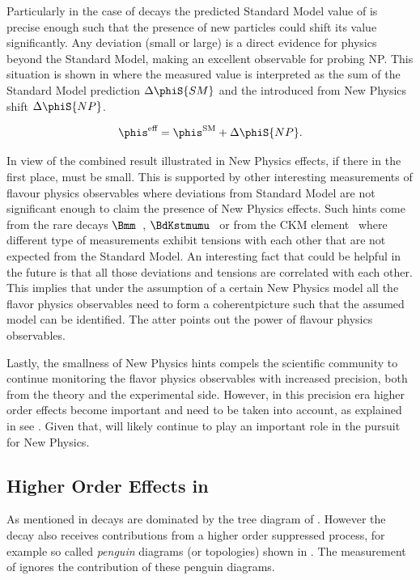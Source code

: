 Particularly in the case of \BsJpsiPhi decays the predicted Standard Model value of  is precise enough
such that the presence of new particles could shift its value ~\cite{Buras:2009if,Chiang:2009ev,Datta:2009fk} significantly.
Any deviation (small or large) is a direct evidence for physics beyond the Standard Model, making \phis an excellent observable for probing NP.
This situation is shown in  where the measured value  is interpreted
as the sum of the Standard Model prediction $\Delta\phiS{SM}$ and the introduced from New Physics shift $\Delta\phiS{NP}$.

\begin{equation}
  \centering
 \phis^{\text {eff}} = \phis^{\tiny \text{SM}} + \Delta\phiS{NP}.
 \label{phis_meas}
\end{equation}

In view of the combined \phis result illustrated in  New Physics effects, if there in the first place, must be small.
This is supported by other interesting measurements of flavour physics observables where deviations from Standard Model are not significant enough
to claim the presence of New Physics effects. Such hints come from the rare decays $\Bmm$~\cite{CMS:2014xfa}, $\BdKstmumu$~\cite{Aaij:2015oid}
or from the \Vub CKM element~\cite{Aaij:2015bfa} where different type of measurements exhibit tensions with each other that are not expected from the Standard Model.
An interesting fact that could be helpful in the future is that all those deviations and tensions are
correlated with each other. This implies that under the assumption of a certain New Physics model all the flavor physics
observables need to form a coherentpicture such that the assumed model can be identified.
The atter points out the power of flavour physics observables.

Lastly, the smallness of New Physics hints compels the scientific community to continue monitoring  the
flavor physics observables with increased precision, both from the theory and the experimental side.
However, in this precision era higher order effects become important and need to be taken into account,
as explained in see . Given that, \phis will likely continue to play an important
role in the pursuit for New Physics.

\subsection{Higher Order Effects in \phis}
\label{TheBsJpsiKstDecay}
As mentioned in  \BsJpsiPhi decays are dominated by the tree diagram of .
However the decay also receives contributions from a higher order suppressed process, for example so called
{\it penguin} diagrams (or topologies) shown in . The \phis measurement of 
ignores the contribution of these penguin diagrams.

